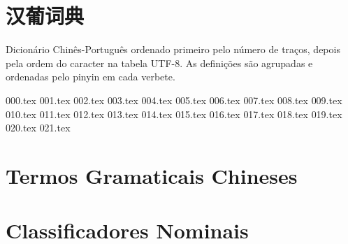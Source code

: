\documentclass[a4paper,9pt,twoside,openany]{memoir}
\begin{document}



\clearpage
\pagestyle{empty}
\tableofcontents

\clearpage
\pagestyle{empty}
\chapter{汉葡词典}

%
%

Dicionário Chinês-Português ordenado primeiro pelo número de traços,
depois pela ordem do caracter na tabela UTF-8.  As definições são
agrupadas e ordenadas pelo pinyin em cada verbete.

\clearpage
\pagestyle{dicionario}
\begin{multicols}{2}
{000.tex}
{001.tex}
{002.tex}
{003.tex}
{004.tex}
{005.tex}
{006.tex}
{007.tex}
{008.tex}
{009.tex}
{010.tex}
{011.tex}
{012.tex}
{013.tex}
{014.tex}
{015.tex}
{016.tex}
{017.tex}
{018.tex}
{019.tex}
{020.tex}
{021.tex}
\end{multicols}

\clearpage
\pagestyle{plain}
\chapter{Termos Gramaticais Chineses}


\clearpage
\pagestyle{plain}
\chapter{Classificadores Nominais}

\end{document}
